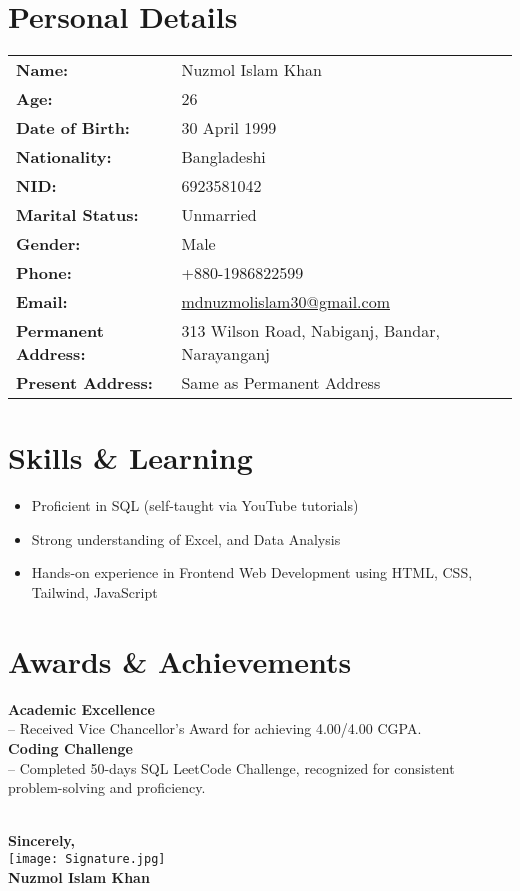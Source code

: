 \documentclass[a4paper,10pt]{article}
\newcommand{\cvsection}[2]{%
  \section*{\textcolor{blue!50!black}{#1}}\label{#2}%
  \vspace{4pt}%
}
\begin{document}
\cvsection{Personal Details}{sec:personal}

\begin{tabular}{p{6cm} p{10cm}}
\textbf{Name:} & Nuzmol Islam Khan \\
\textbf{Age:} & 26 \\
\textbf{Date of Birth:} & 30 April 1999 \\
\textbf{Nationality:} & Bangladeshi \\
\textbf{NID:} & 6923581042 \\
\textbf{Marital Status:} & Unmarried \\
\textbf{Gender:} & Male \\
\textbf{Phone:} & +880-1986822599 \\
\textbf{Email:} & \href{mailto:mdnuzmolislam30@gmail.com}{mdnuzmolislam30@gmail.com} \\
\textbf{Permanent Address:} & 313 Wilson Road, Nabiganj, Bandar, Narayanganj \\
\textbf{Present Address:} & Same as Permanent Address \\
\end{tabular}

\cvsection{Skills \& Learning}{sec:learning}
\begin{itemize}
  \item Proficient in SQL (self-taught via YouTube tutorials)
  \item Strong understanding of Excel, and Data Analysis
  \item Hands-on experience in Frontend Web Development using HTML, CSS, Tailwind, JavaScript
\end{itemize}

\cvsection{Awards \& Achievements}{sec:awards}

\textbf{Academic Excellence} \\
-- Received Vice Chancellor's Award for achieving 4.00/4.00 CGPA. \\[1mm]

\textbf{Coding Challenge} \\
-- Completed 50-days SQL LeetCode Challenge, recognized for consistent problem-solving and proficiency.

\vspace{14pt}

\vspace{10pt}
\\[3pt]
\textbf{Sincerely,} \\[6pt]
\texttt{[image: Signature.jpg]} \\ %
\textbf{Nuzmol Islam Khan}
\end{document}
